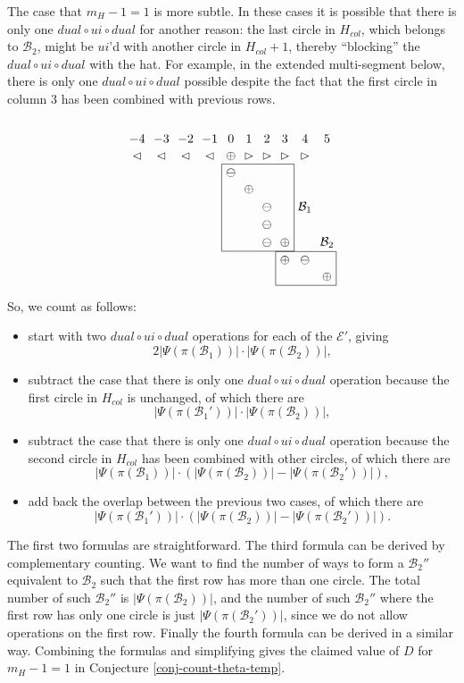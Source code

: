 \documentclass[11pt,letterpaper]{amsart}
\newcommand{\BB}{\mathcal{B}}
\newcommand{\EE}{\mathcal{E}}
\numberwithin{equation}{section}
\begin{document}
The case that $m_H - 1 = 1$ is more subtle. In these cases it is possible that there is only one $dual \circ ui \circ dual$ for another reason: the last circle in $H_{col}$, which belongs to $\BB_2$, might be $ui$'d with another circle in $H_{col}+1$, thereby ``blocking'' the $dual \circ ui \circ dual$ with the hat. For example, in the extended multi-segment below, there is only one $dual \circ ui \circ dual$ possible despite the fact that the first circle in column $3$ has been combined with previous rows. 
\[\begin{tikzpicture}[baseline=(current bounding box.north)]
  \matrix (m)[matrix of math nodes, nodes in empty cells] {
    -4 & -3 & -2 & -1 & 0 & 1 & 2 & 3 & 4 & 5 \\
    \lhd & \lhd & \lhd & \lhd & \oplus & \rhd & \rhd & \rhd & \rhd & \\
    & & & & \ominus & & & & & \\
    & & & & & \oplus & & & & \\
    & & & & & & \ominus & & \BB_1 & \\
    & & & & & & \ominus & & & \\
    & & & & & & \ominus & \oplus & & \BB_2 \\
    & & & & & & & \oplus & \ominus & \\
    & & & & & & & & & \oplus \\
  } ;
  \draw (m-3-5.north west) rectangle (m-7-8.south east);
  \draw (m-8-8.north west) rectangle (m-9-10.south east);
\end{tikzpicture}\] So, we count as follows:
\begin{itemize}
    \item start with two $dual \circ ui \circ dual$ operations for each of the $\EE'$, giving \[2 |\Psi(\pi(\BB_1))| \cdot |\Psi(\pi(\BB_2))|,\]
    \item subtract the case that there is only one $dual \circ ui \circ dual$ operation because the first circle in $H_{col}$ is unchanged, of which there are \[|\Psi(\pi(\BB_1'))| \cdot |\Psi(\pi(\BB_2))|,\]
    \item subtract the case that there is only one $dual \circ ui \circ dual$ operation because the second circle in $H_{col}$ has been combined with other circles, of which there are \[|\Psi(\pi(\BB_1))| \cdot (|\Psi(\pi(\BB_2))| - |\Psi(\pi(\BB_2'))|),\]
    \item add back the overlap between the previous two cases, of which there are \[|\Psi(\pi(\BB_1'))| \cdot (|\Psi(\pi(\BB_2))| - |\Psi(\pi(\BB_2'))|).\]
\end{itemize}
The first two formulas are straightforward. The third formula can be derived by complementary counting. We want to find the number of ways to form a $\BB_2''$ equivalent to $\BB_2$ such that the first row has more than one circle. The total number of such $\BB_2''$ is $|\Psi(\pi(\BB_2))|$, and the number of such $\BB_2''$ where the first row has only one circle is just $|\Psi(\pi(\BB_2'))|$, since we do not allow operations on the first row. Finally the fourth formula can be derived in a similar way. Combining the formulas and simplifying gives the claimed value of $D$ for $m_H - 1 = 1$ in Conjecture \ref{conj-count-theta-temp}.
\end{document}
